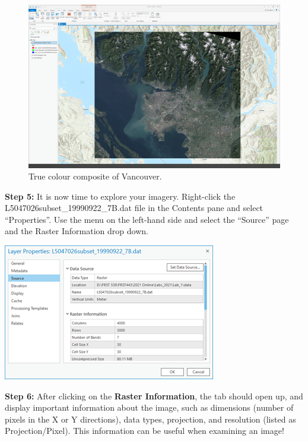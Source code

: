 \documentclass[
]{book}
\begin{document}
\begin{figure}

{\centering \includegraphics[width=1\linewidth]{images/01-true-colour-composite-vancouver} 

}

\caption{True colour composite of Vancouver.}\label{fig:01-true-colour-composite-vancouver}
\end{figure}

\textbf{Step 5:} It is now time to explore your imagery. Right-click the L5047026subset\_19990922\_7B.dat file in the Contents pane and select ``Properties''. Use the menu on the left-hand side and select the ``Source'' page and the Raster Information drop down.

\begin{center}\includegraphics[width=0.5\linewidth]{images/01-raster-information-drop-down} \end{center}

\textbf{Step 6:} After clicking on the \textbf{Raster Information}, the tab should open up, and display important information about the image, such as dimensions (number of pixels in the X or Y directions), data types, projection, and resolution (listed as Projection/Pixel). This information can be useful when examining an image!
\end{document}
